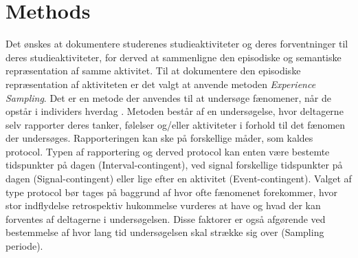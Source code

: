 \section*{Methods}
\label{Methods}
%
Det ønskes at dokumentere studerenes studieaktiviteter og deres forventninger til deres studieaktiviteter, for derved at sammenligne den episodiske og semantiske repræsentation af samme aktivitet. Til at dokumentere den episodiske repræsentation af aktiviteten er det valgt at anvende metoden \textit{Experience Sampling}. Det er en metode der anvendes til at undersøge fænomener, når de opstår i individers hverdag \cite[p. 53]{PracticalGuide}. Metoden består af en undersøgelse, hvor deltagerne selv rapporter deres tanker, følelser og/eller aktiviteter i forhold til det fænomen der undersøges. Rapporteringen kan ske på forskellige måder, som kaldes protocol. Typen af rapportering og derved protocol kan enten være bestemte tidspunkter på dagen (Interval-contingent), ved signal forskellige tidspunkter på dagen (Signal-contingent) eller lige efter en aktivitet (Event-contingent). 
Valget af type protocol bør tages på baggrund af hvor ofte fænomenet forekommer, hvor stor indflydelse retrospektiv hukommelse vurderes at have og hvad der kan forventes af deltagerne i undersøgelsen. Disse faktorer er også afgørende ved bestemmelse af hvor lang tid undersøgelsen skal strække sig over (Sampling periode). 

